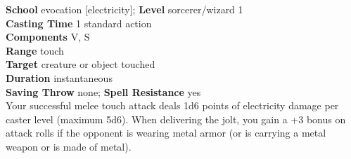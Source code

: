 \textbf{School} evocation [electricity]; \textbf{Level} sorcerer/wizard 1\\
\textbf{Casting Time} 1 standard action\\
\textbf{Components} V, S\\
\textbf{Range} touch\\
\textbf{Target} creature or object touched\\
\textbf{Duration} instantaneous\\
\textbf{Saving Throw} none; \textbf{Spell Resistance} yes\\
Your successful melee touch attack deals 1d6 points of electricity damage per caster level (maximum 5d6). When delivering the jolt, you gain a +3 bonus on attack rolls if the opponent is wearing metal armor (or is carrying a metal weapon or is made of metal).\\
